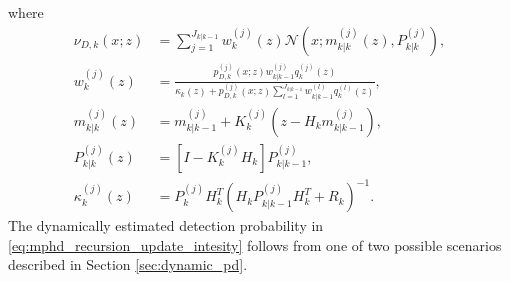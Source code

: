 where
\begin{align}
  \nu_{D,k}(x;z) &= \sum_{j=1}^{J_{k|k-1}} w_k^{(j)}(z) \mathcal{N}(x;m_{k|k}^{(j)}(z),P_{k|k}^{(j)}), \label{eq:mphd_recursion_update_intesity_detect} \\
  w_k^{(j)}(z) &= \frac{p_{D,k}^{(j)}(x;z) w_{k|k-1}^{(j)} q_k^{(j)}(z) }{\kappa_k(z) + p_{D,k}^{(j)}(x;z) \sum_{l=1}^{J_{k|k-1}} w_{k|k-1}^{(l)} q_k^{(l)}(z)}, \label{eq:mphd_recursion_update_intesity_detect_w} \\
  m_{k|k}^{(j)}(z) &= m_{k|k-1}^{(j)} + K_k^{(j)}(z-H_k m_{k|k-1}^{(j)}), \label{eq:mphd_recursion_update_intesity_detect_m} \\
  P_{k|k}^{(j)}(z) &= [I - K_k^{(j)} H_k] P_{k|k-1}^{(j)},  \label{eq:mphd_recursion_update_intesity_detect_P} \\
  \kappa_{k}^{(j)}(z) &= P_{k}^{(j)} H_k^T(H_k P_{k|k-1}^{(j)} H_k^T + R_k)^{-1}. \label{eq
  :mphd_recursion_update_intesity_detect_K}
\end{align}
The dynamically estimated detection probability in \eqref{eq:mphd_recursion_update_intesity} follows from one of two
possible scenarios described in Section \ref{sec:dynamic_pd}.
